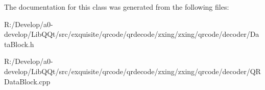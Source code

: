 The documentation for this class was generated from the following files\+:\begin{DoxyCompactItemize}
\item 
R\+:/\+Develop/a0-\/develop/\+Lib\+Q\+Qt/src/exquisite/qrcode/qrdecode/zxing/zxing/qrcode/decoder/Data\+Block.\+h\item 
R\+:/\+Develop/a0-\/develop/\+Lib\+Q\+Qt/src/exquisite/qrcode/qrdecode/zxing/zxing/qrcode/decoder/Q\+R\+Data\+Block.\+cpp\end{DoxyCompactItemize}
